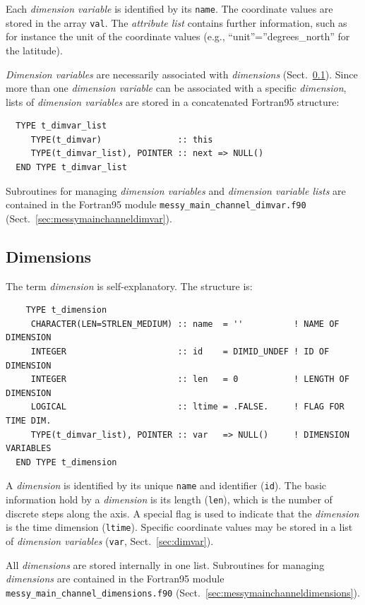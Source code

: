 \documentclass[twoside]{article}
\begin{document}
Each {\it dimension variable} is identified by its {\tt name}. The
coordinate values are stored in the array {\tt val}. The {\it attribute list}
contains further information, such as for instance the unit of the coordinate
values (e.g., ``unit''=''degrees\_north'' for the latitude).

{\it Dimension variables} are necessarily associated with {\it dimensions}
(Sect.~\ref{sec:dim}). Since more than one {\it dimension variable} can be
associated with a specific {\it dimension}, lists of
{\it dimension variables} are stored in a concatenated Fortran95 structure:

\begin{verbatim}
  TYPE t_dimvar_list
     TYPE(t_dimvar)               :: this
     TYPE(t_dimvar_list), POINTER :: next => NULL()
  END TYPE t_dimvar_list
\end{verbatim}

Subroutines for managing {\it dimension variables} and
{\it dimension variable lists} are contained in the Fortran95
module {\tt messy\_main\_channel\_dimvar.f90}
(Sect.~\ref{sec:messymainchanneldimvar}).

\subsection{Dimensions}
\label{sec:dim}

The term {\it dimension} is self-explanatory. The structure is:
%
\begin{verbatim}
    TYPE t_dimension
     CHARACTER(LEN=STRLEN_MEDIUM) :: name  = ''          ! NAME OF DIMENSION
     INTEGER                      :: id    = DIMID_UNDEF ! ID OF DIMENSION
     INTEGER                      :: len   = 0           ! LENGTH OF DIMENSION
     LOGICAL                      :: ltime = .FALSE.     ! FLAG FOR TIME DIM.
     TYPE(t_dimvar_list), POINTER :: var   => NULL()     ! DIMENSION VARIABLES
  END TYPE t_dimension
\end{verbatim}
%
A {\it dimension} is identified by its unique {\tt name} and identifier
({\tt id}). The basic information hold by a {\it dimension} is its
length ({\tt len}), which is the number of discrete steps along the axis.
A special flag is used to indicate
that the {\it dimension} is the time dimension ({\tt ltime}).
Specific coordinate
values may be stored in a list of {\it dimension variables}
({\tt var}, Sect.~\ref{sec:dimvar}).

All {\it dimensions} are stored internally in one list.
Subroutines for managing {\it dimensions} are contained in the Fortran95
module {\tt messy\_main\_channel\_dimensions.f90}
(Sect.~\ref{sec:messymainchanneldimensions}).
\end{document}

